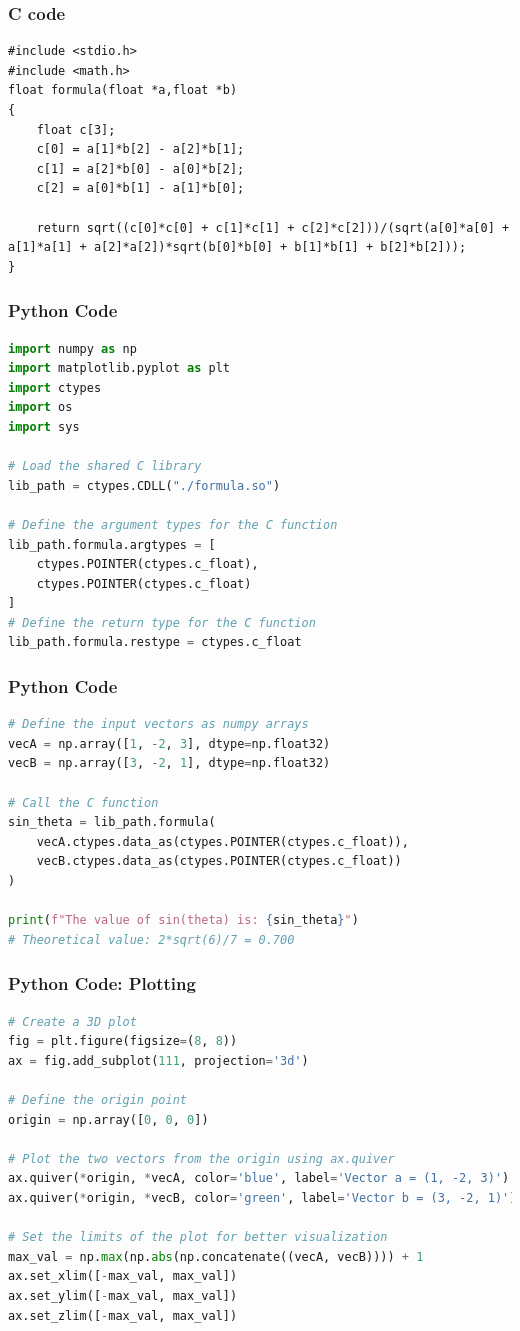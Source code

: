 \documentclass{beamer}
\begin{document}
\begin{frame}[fragile]
    \frametitle{C code}
    \begin{lstlisting}
#include <stdio.h>
#include <math.h>
float formula(float *a,float *b)
{
    float c[3];
    c[0] = a[1]*b[2] - a[2]*b[1];
    c[1] = a[2]*b[0] - a[0]*b[2];
    c[2] = a[0]*b[1] - a[1]*b[0];
    
    return sqrt((c[0]*c[0] + c[1]*c[1] + c[2]*c[2]))/(sqrt(a[0]*a[0] + a[1]*a[1] + a[2]*a[2])*sqrt(b[0]*b[0] + b[1]*b[1] + b[2]*b[2]));
}
    \end{lstlisting}
\end{frame}

\begin{frame}[fragile]
    \frametitle{Python Code}
    \begin{lstlisting}[language=Python]
import numpy as np
import matplotlib.pyplot as plt
import ctypes
import os
import sys

# Load the shared C library
lib_path = ctypes.CDLL("./formula.so")

# Define the argument types for the C function
lib_path.formula.argtypes = [
    ctypes.POINTER(ctypes.c_float),
    ctypes.POINTER(ctypes.c_float)
]
# Define the return type for the C function
lib_path.formula.restype = ctypes.c_float
    \end{lstlisting}
\end{frame}

\begin{frame}[fragile]
    \frametitle{Python Code}
    \begin{lstlisting}[language=Python]
# Define the input vectors as numpy arrays
vecA = np.array([1, -2, 3], dtype=np.float32)
vecB = np.array([3, -2, 1], dtype=np.float32)

# Call the C function
sin_theta = lib_path.formula(
    vecA.ctypes.data_as(ctypes.POINTER(ctypes.c_float)),
    vecB.ctypes.data_as(ctypes.POINTER(ctypes.c_float))
)

print(f"The value of sin(theta) is: {sin_theta}")
# Theoretical value: 2*sqrt(6)/7 = 0.700
    \end{lstlisting}
\end{frame}

\begin{frame}[fragile]
    \frametitle{Python Code: Plotting}
    \begin{lstlisting}[language=Python]
# Create a 3D plot
fig = plt.figure(figsize=(8, 8))
ax = fig.add_subplot(111, projection='3d')

# Define the origin point
origin = np.array([0, 0, 0])

# Plot the two vectors from the origin using ax.quiver
ax.quiver(*origin, *vecA, color='blue', label='Vector a = (1, -2, 3)')
ax.quiver(*origin, *vecB, color='green', label='Vector b = (3, -2, 1)')

# Set the limits of the plot for better visualization
max_val = np.max(np.abs(np.concatenate((vecA, vecB)))) + 1
ax.set_xlim([-max_val, max_val])
ax.set_ylim([-max_val, max_val])
ax.set_zlim([-max_val, max_val])
    \end{lstlisting}
\end{frame}
\end{document}
